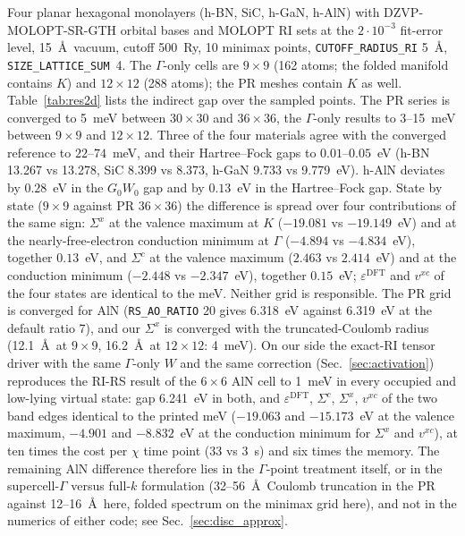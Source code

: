 \documentclass[%
 reprint,
superscriptaddress,
 amsmath,amssymb,
 aps,
prb,
]{revtex4-2}
\begin{document}
Four planar hexagonal monolayers (h-BN, SiC, h-GaN, h-AlN) with DZVP-MOLOPT-SR-GTH orbital
bases and MOLOPT RI sets at the $2\cdot10^{-3}$ fit-error level, 15~\AA\ vacuum, cutoff
500~Ry, 10 minimax points, \texttt{CUTOFF\_RADIUS\_RI} 5~\AA, \texttt{SIZE\_LATTICE\_SUM}~4.
The $\Gamma$-only cells are $9\times9$ (162 atoms; the folded manifold contains $K$) and
$12\times12$ (288 atoms); the PR meshes contain $K$ as well. Table~\ref{tab:res2d} lists the
indirect gap over the sampled points. The PR series is converged to 5~meV between
$30\times30$ and $36\times36$, the $\Gamma$-only results to 3--15~meV between $9\times9$ and
$12\times12$. Three of the four materials agree with the converged reference to
$22$--$74$~meV, and their Hartree--Fock gaps to $0.01$--$0.05$~eV (h-BN 13.267 vs 13.278, SiC
8.399 vs 8.373, h-GaN 9.733 vs 9.779~eV). h-AlN deviates by $0.28$~eV in the $G_0W_0$ gap and
by $0.13$~eV in the Hartree--Fock gap. State by state ($9\times9$ against PR $36\times36$)
the difference is spread over four contributions of the same sign: $\Sigma^x$ at the valence
maximum at $K$ ($-19.081$ vs $-19.149$~eV) and at the nearly-free-electron conduction minimum
at $\Gamma$ ($-4.894$ vs $-4.834$~eV), together $0.13$~eV, and $\Sigma^c$ at the valence
maximum ($2.463$ vs $2.414$~eV) and at the conduction minimum ($-2.448$ vs $-2.347$~eV),
together $0.15$~eV; $\varepsilon^\mathrm{DFT}$ and $v^{xc}$ of the four states are identical
to the meV. Neither grid is responsible. The PR grid is converged for AlN
(\texttt{RS\_AO\_RATIO} 20 gives 6.318~eV against 6.319~eV at the default ratio 7), and our
$\Sigma^x$ is converged with the truncated-Coulomb radius (12.1~\AA\ at $9\times9$, 16.2~\AA\
at $12\times12$: 4~meV). On our side the exact-RI tensor driver with the same $\Gamma$-only $W$
and the same correction (Sec.~\ref{sec:activation}) reproduces the RI-RS result of the
$6\times6$ AlN cell to 1~meV in every occupied and low-lying virtual state: gap 6.241~eV in
both, and $\varepsilon^\mathrm{DFT}$, $\Sigma^c$, $\Sigma^x$, $v^{xc}$ of the two band edges identical
to the printed meV ($-19.063$ and $-15.173$~eV at the valence maximum, $-4.901$ and
$-8.832$~eV at the conduction minimum for $\Sigma^x$ and $v^{xc}$), at ten times the cost per
$\chi$ time point (33 vs 3~s) and six times the memory. The remaining AlN difference therefore lies in the
$\Gamma$-point treatment itself, or in the supercell-$\Gamma$ versus full-$k$ formulation
(32--56~\AA\ Coulomb truncation in the PR against 12--16~\AA\ here, folded spectrum on the
minimax grid here), and not in
the numerics of either code; see Sec.~\ref{sec:disc_approx}.
\end{document}
